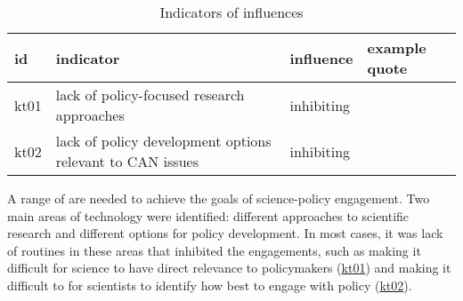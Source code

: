\begin{table}[!ht]
\footnotesize
\caption{Indicators of \skitech{} influences}\label{tab:resskitech}
\begin{tabular}{L{.07\linewidth}L{.3\linewidth}L{.11\linewidth}L{.52\linewidth}} \hline
\textbf{id} & \textbf{indicator} & \textbf{influence} & \textbf{example quote} \\ \hline \hline 
kt01 & lack of policy-focused research approaches & inhibiting &  \\[5mm]
kt02 & lack of policy development options relevant to CAN issues & inhibiting &  \\[5mm]
\hline
\end{tabular}
\end{table}

A range of \skitech{} are needed to achieve the goals of science-policy engagement. Two main areas of technology were identified: different approaches to scientific research and different options for policy development. In most cases, it was lack of routines in these areas that inhibited the engagements, such as making it difficult for science to have direct relevance to policymakers (\hyperref[tab:resskitech]{kt01}) and making it difficult to for scientists to identify how best to engage with policy (\hyperref[tab:resskitech]{kt02}).

